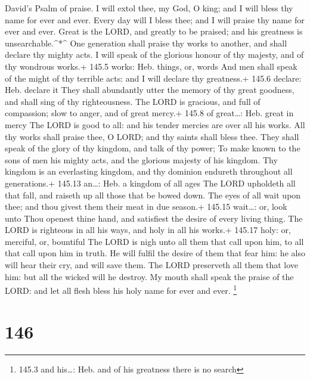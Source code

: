David's Psalm of praise.  I will extol thee, my God, O king;
and I will bless thy name for ever and ever.  Every day will
I bless thee; and I will praise thy name for ever and ever. 
Great is the LORD, and greatly to be praised; and his greatness is
unsearchable.\^{}*\^{}  One generation shall praise thy
works to another, and shall declare thy mighty acts.  I will
speak of the glorious honour of thy majesty, and of thy wondrous works.+
145.5 works: Heb. things, or, words  And men shall speak of
the might of thy terrible acts: and I will declare thy greatness.+ 145.6
declare: Heb. declare it  They shall abundantly utter the
memory of thy great goodness, and shall sing of thy righteousness.
 The LORD is gracious, and full of compassion; slow to
anger, and of great mercy.+ 145.8 of great\ldots: Heb. great in mercy
 The LORD is good to all: and his tender mercies are over
all his works.  All thy works shall praise thee, O LORD;
and thy saints shall bless thee.  They shall speak of the
glory of thy kingdom, and talk of thy power;  To make known
to the sons of men his mighty acts, and the glorious majesty of his
kingdom.  Thy kingdom is an everlasting kingdom, and thy
dominion endureth throughout all generations.+ 145.13 an\ldots: Heb. a
kingdom of all ages  The LORD upholdeth all that fall, and
raiseth up all those that be bowed down.  The eyes of all
wait upon thee; and thou givest them their meat in due season.+ 145.15
wait\ldots: or, look unto  Thou openest thine hand, and
satisfiest the desire of every living thing.  The LORD is
righteous in all his ways, and holy in all his works.+ 145.17 holy: or,
merciful, or, bountiful  The LORD is nigh unto all them
that call upon him, to all that call upon him in truth.  He
will fulfil the desire of them that fear him: he also will hear their
cry, and will save them.  The LORD preserveth all them that
love him: but all the wicked will he destroy.  My mouth
shall speak the praise of the LORD: and let all flesh bless his holy
name for ever and ever. \footnote{145.3 and his\ldots: Heb. and of his
  greatness there is no search}

\hypertarget{section-146}{%
\section{146}\label{section-146}}


